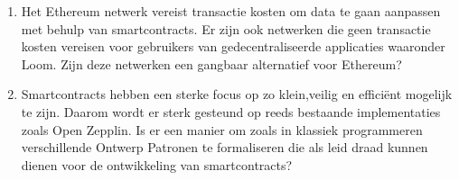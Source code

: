 \begin{enumerate}
\item Het Ethereum netwerk vereist transactie kosten om data te gaan aanpassen met behulp van smartcontracts. Er zijn ook netwerken die geen transactie kosten vereisen voor gebruikers van gedecentraliseerde applicaties waaronder Loom. Zijn deze netwerken een gangbaar alternatief voor Ethereum?
\item Smartcontracts hebben een sterke focus op zo klein,veilig en efficiënt mogelijk te zijn. Daarom wordt er sterk gesteund op reeds bestaande implementaties zoals Open Zepplin. Is er een manier om zoals in klassiek programmeren verschillende Ontwerp Patronen te formaliseren die als leid draad kunnen dienen voor de ontwikkeling van smartcontracts?
\end{enumerate}

